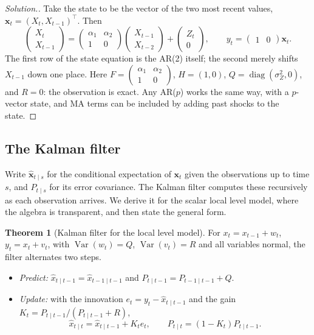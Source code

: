 \documentclass[11pt,a4paper]{article}
\theoremstyle{definition}
\newtheorem{thm}{Theorem}[subsection]
\newenvironment{solution}
  {\renewcommand{\qedsymbol}{}\begin{proof}[\textit{Solution}.]}
  {\end{proof}}
\DeclareMathOperator{\Var}{Var}
\begin{document}
\begin{solution}
Take the state to be the vector of the two most recent values, $\mathbf{x}_t = (X_t, X_{t-1})^\top$. Then
\[
\begin{pmatrix} X_t \\ X_{t-1} \end{pmatrix} = \begin{pmatrix} \alpha_1 & \alpha_2 \\ 1 & 0 \end{pmatrix}\begin{pmatrix} X_{t-1} \\ X_{t-2} \end{pmatrix} + \begin{pmatrix} Z_t \\ 0 \end{pmatrix} ,
\qquad y_t = \begin{pmatrix} 1 & 0 \end{pmatrix}\mathbf{x}_t .
\]
The first row of the state equation is the AR(2) itself; the second merely shifts $X_{t-1}$ down one place. Here
$F = \begin{pmatrix} \alpha_1 & \alpha_2 \\ 1 & 0 \end{pmatrix}$, $H = (1, 0)$, $Q = \operatorname{diag}(\sigma_Z^2, 0)$, and $R = 0$: the observation is exact. Any AR($p$) works the same way, with a
$p$-vector state, and MA terms can be included by adding past shocks to the state.
\end{solution}

\subsection{The Kalman filter}

Write $\hat{\mathbf{x}}_{t\mid s}$ for the conditional expectation of $\mathbf{x}_t$ given the observations up to time $s$, and $P_{t\mid s}$ for its error covariance.
The Kalman filter computes these recursively as each observation arrives. We derive it for the scalar
local level model, where the algebra is transparent, and then state the general form.

\begin{thm}[Kalman filter for the local level model]\label{thm:kalman-scalar}
For $x_t = x_{t-1} + w_t$, $y_t = x_t + v_t$, with $\Var(w_t) = Q$, $\Var(v_t) = R$ and all variables normal, the filter alternates two
steps.
\begin{itemize}
\item \emph{Predict:} $\hat x_{t\mid t-1} = \hat x_{t-1\mid t-1}$ and $P_{t\mid t-1} = P_{t-1\mid t-1} + Q$.
\item \emph{Update:} with the innovation $e_t = y_t - \hat x_{t\mid t-1}$ and the gain $K_t = P_{t\mid t-1}/(P_{t\mid t-1} + R)$,
\[
\hat x_{t\mid t} = \hat x_{t\mid t-1} + K_te_t , \qquad P_{t\mid t} = (1 - K_t)P_{t\mid t-1} .
\]
\end{itemize}
\end{thm}
\end{document}
